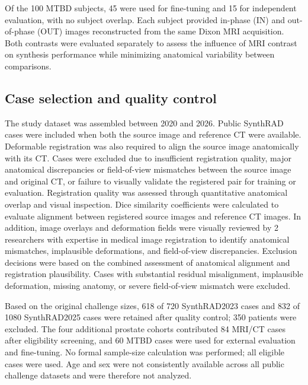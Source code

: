 \documentclass{article}
\begin{document}
Of the 100 MTBD subjects, 45 were used for fine-tuning and 15 for independent evaluation, with no subject overlap. Each subject provided in-phase (IN) and out-of-phase (OUT) images reconstructed from the same Dixon MRI acquisition. Both contrasts were evaluated separately to assess the influence of MRI contrast on synthesis performance while minimizing anatomical variability between comparisons.

\subsection{Case selection and quality control}

The study dataset was assembled between 2020 and 2026. Public SynthRAD cases were included when both the source image and reference CT were available. Deformable registration was also required to align the source image anatomically with its CT. Cases were excluded due to insufficient registration quality, major anatomical discrepancies or field-of-view mismatches between the source image and original CT, or failure to visually validate the registered pair for training or evaluation. Registration quality was assessed through quantitative anatomical overlap and visual inspection. Dice similarity coefficients were calculated to evaluate alignment between registered source images and reference CT images. In addition, image overlays and deformation fields were visually reviewed by 2 researchers with expertise in medical image registration to identify anatomical mismatches, implausible deformations, and field-of-view discrepancies. Exclusion decisions were based on the combined assessment of anatomical alignment and registration plausibility. Cases with substantial residual misalignment, implausible deformation, missing anatomy, or severe field-of-view mismatch were excluded.


Based on the original challenge sizes, 618 of 720 SynthRAD2023 cases and 832 of 1080 SynthRAD2025 cases were retained after quality control; 350 patients were excluded. The four additional prostate cohorts contributed 84 MRI/CT cases after eligibility screening, and 60 MTBD cases were used for external evaluation and fine-tuning. No formal sample-size calculation was performed; all eligible cases were used. Age and sex were not consistently available across all public challenge datasets and were therefore not analyzed.
\end{document}
